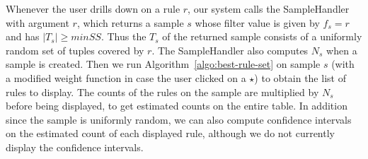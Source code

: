 Whenever the user drills down on a rule $r$, our system calls the SampleHandler with argument $r$, which returns a sample $s$ whose filter value is given by $f_s = r$ and has $|T_s| \geq minSS$. Thus the $T_s$ of the returned sample consists of a uniformly random set of tuples covered by $r$. The SampleHandler also computes $N_s$ when a sample is created. Then we run Algorithm~\ref{algo:best-rule-set} on sample $s$ (with a modified weight function in case the user clicked on a $\star$) to obtain the list of rules to display. The counts of the rules on the sample are multiplied by $N_s$ before being displayed, to get estimated counts on the entire table. In addition since the sample is uniformly random, we can also compute confidence intervals on the estimated count of each displayed rule, although we do not currently display the confidence intervals.

